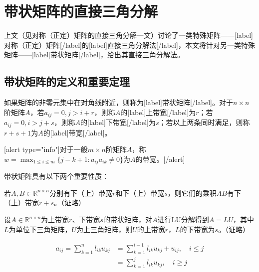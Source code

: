 \documentclass[UTF8,nofonts]{ctexart}
\begin{document}
\section*{带状矩阵的直接三角分解}

上文（见对称（正定）矩阵的直接三角分解一文）讨论了一类特殊矩阵——[label]对称（正定）矩阵[/label]的[label]直接三角分解法[/label]，本文将针对另一类特殊矩阵——[label]带状矩阵[/label]，给出其直接三角分解法。

\subsection*{带状矩阵的定义和重要定理}

如果矩阵的非零元集中在对角线附近，则称为[label]带状矩阵[/label]。对于$n \times n$阶矩阵$A$，若$a_{ij}=0,j>i+r$，则称$A$的[label]上带宽[/label]为$r$；若$a_{ij}=0,i>j+s$，则称$A$的[label]下带宽[/label]为$s$；若以上两条同时满足，则称$r+s+1$为$A$的[label]带宽[/label]。

[alert type="info"]对于一般$m \times n$阶矩阵$A$，称$w=\displaystyle{\max_{1\leq i \leq m}\{j-k+1:a_{ij}a_{ik}\neq 0\}}$为$A$的带宽。[/alert]

带状矩阵具有以下两个重要性质：

若$A,B\in\mathbb{R}^{n \times n}$分别有下（上）带宽$r$和下（上）带宽$s$，则它们的乘积$AB$有下（上）带宽$r+s$。（证略）

设$A\in\mathbb{R}^{n \times n}$为上带宽$r$、下带宽$s$的带状矩阵，对$A$进行LU分解得到$A=LU$，其中$L$为单位下三角矩阵，$U$为上三角矩阵，则$U$的上带宽$r$，$L$的下带宽为$s$。（证略）

\begin{align*}
a_{ij}=\sum_{k=1}^nl_{ik}u_{kj}&=\sum_{k=1}^{i-1}l_{ik}u_{kj}+u_{ij},\quad i \leq j\\
&=\sum_{k=1}^{j}l_{ik}u_{kj},\quad i \geq j
\end{align*}
\end{document}
